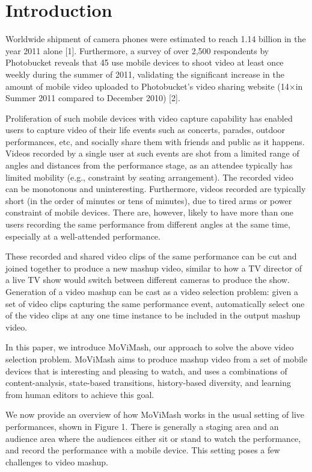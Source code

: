 \documentclass{sig-alternate}
\begin{document}
\section{Introduction}
Worldwide shipment of camera phones were estimated to reach
1.14 billion in the year 2011 alone [1]. Furthermore, a survey of
over 2,500 respondents by Photobucket reveals that 45%
use mobile devices to shoot video at least once weekly during the summer of 2011, validating the significant increase in
the amount of mobile video uploaded to Photobucket’s video sharing
website (14×in Summer 2011 compared to December 2010) [2].

Proliferation of such mobile devices with video capture capability
has enabled users to capture video of their life events such
as concerts, parades, outdoor performances, etc, and socially share
them with friends and public as it happens. Videos recorded by
a single user at such events are shot from a limited range of angles
and distances from the performance stage, as an attendee typically
has limited mobility (e.g., constraint by seating arrangement).
The recorded video can be monotonous and uninteresting. Furthermore,
videos recorded are typically short (in the order of minutes
or tens of minutes), due to tired arms or power constraint of mobile
devices. There are, however, likely to have more than one users
recording the same performance from different angles at the same
time, especially at a well-attended performance.

These recorded and shared video clips of the same performance
can be cut and joined together to produce a new mashup video,
similar to how a TV director of a live TV show would switch between
different cameras to produce the show. Generation of a video
mashup can be cast as a video selection problem: given a set of
video clips capturing the same performance event, automatically
select one of the video clips at any one time instance to be included
in the output mashup video.

In this paper, we introduce MoViMash, our approach to solve
the above video selection problem. MoViMash aims to produce
mashup video from a set of mobile devices that is interesting and
pleasing to watch, and uses a combinations of content-analysis,
state-based transitions, history-based diversity, and learning from
human editors to achieve this goal.

We now provide an overview of how MoViMash works in the
usual setting of live performances, shown in Figure 1. There is
generally a staging area and an audience area where the audiences
either sit or stand to watch the performance, and record the performance
with a mobile device. This setting poses a few challenges to
video mashup.
\end{document}
